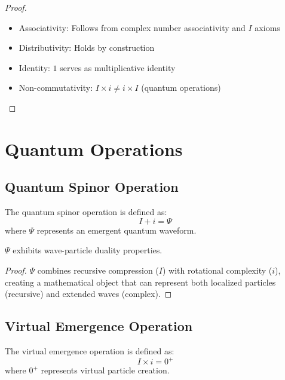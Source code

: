 \documentclass[12pt,a4paper]{article}
\begin{document}
\begin{proof}
\begin{itemize}
\item Associativity: Follows from complex number associativity and $I$ axioms
\item Distributivity: Holds by construction
\item Identity: $1$ serves as multiplicative identity
\item Non-commutativity: $I \times i \neq i \times I$ (quantum operations)
\end{itemize}
\end{proof}

\section{Quantum Operations}

\subsection{Quantum Spinor Operation}

\begin{definition}
The quantum spinor operation is defined as:
\begin{equation}
I + i = \Psi
\end{equation}
where $\Psi$ represents an emergent quantum waveform.
\end{definition}

\begin{theorem}
$\Psi$ exhibits wave-particle duality properties.
\end{theorem}

\begin{proof}
$\Psi$ combines recursive compression ($I$) with rotational complexity ($i$), creating a mathematical object that can represent both localized particles (recursive) and extended waves (complex).
\end{proof}

\subsection{Virtual Emergence Operation}

\begin{definition}
The virtual emergence operation is defined as:
\begin{equation}
I \times i = 0^+
\end{equation}
where $0^+$ represents virtual particle creation.
\end{definition}
\end{document}

